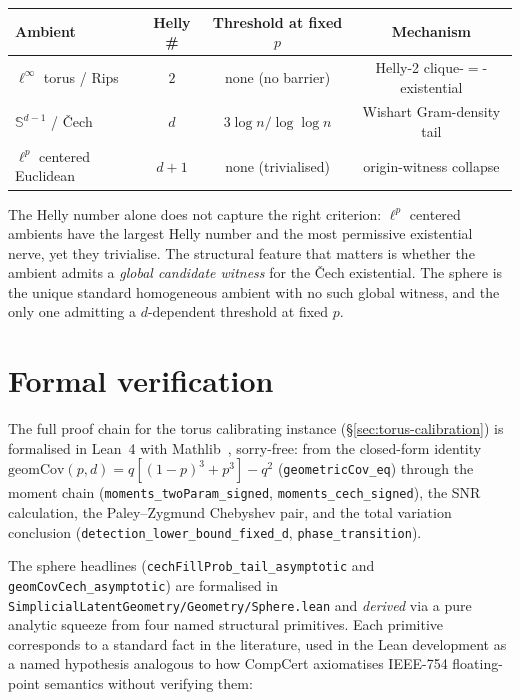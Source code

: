\documentclass[reqno,12pt]{amsart}
\newcommand{\geomCov}{\mathrm{geomCov}}
\newcommand{\Sph}{\mathbb{S}}
\newcommand{\lean}[1]{\textup{\texttt{\small #1}}}
\theoremstyle{plain}
\theoremstyle{definition}
\theoremstyle{remark}
\begin{document}
\begin{center}
\renewcommand{\arraystretch}{1.2}
\begin{tabular}{l|c|c|c}
\textbf{Ambient} & \textbf{Helly \#} & \textbf{Threshold at fixed $p$} & \textbf{Mechanism} \\\hline
$\ell^\infty$ torus / Rips & $2$ & none (no barrier) & Helly-2 clique-$=$-existential \\
$\Sph^{d-1}$ / \v{C}ech & $d$ & $3 \log n / \log\log n$ & Wishart Gram-density tail \\
$\ell^p$ centered Euclidean & $d{+}1$ & none (trivialised) & origin-witness collapse \\
\end{tabular}
\end{center}

\noindent The Helly number alone does not capture the right criterion: $\ell^p$ centered
ambients have the largest Helly number and the most permissive existential nerve, yet
they trivialise. The structural feature that matters is whether the ambient admits a
\emph{global candidate witness} for the \v{C}ech existential. The sphere is the unique
standard homogeneous ambient with no such global witness, and the only one admitting a
$d$-dependent threshold at fixed $p$.

\section{Formal verification}\label{sec:lean}

The full proof chain for the torus calibrating instance (\S\ref{sec:torus-calibration})
is formalised in Lean~4 with Mathlib~\cite{Mathlib2020}, sorry-free: from the closed-form
identity $\geomCov(p, d) = q[(1-p)^3 + p^3] - q^2$ (\lean{geometricCov\_eq}) through the
moment chain (\lean{moments\_twoParam\_signed}, \lean{moments\_cech\_signed}), the SNR
calculation, the Paley--Zygmund Chebyshev pair, and the total variation conclusion
(\lean{detection\_lower\_bound\_fixed\_d}, \lean{phase\_transition}).

The sphere headlines (\lean{cechFillProb\_tail\_asymptotic} and
\lean{geomCovCech\_asymptotic}) are formalised in
\texttt{SimplicialLatentGeometry/Geometry/Sphere.lean} and \emph{derived} via a pure
analytic squeeze from four named structural primitives. Each primitive corresponds to a
standard fact in the literature, used in the Lean development as a named hypothesis
analogous to how CompCert axiomatises IEEE-754 floating-point semantics without verifying
them:
\end{document}
